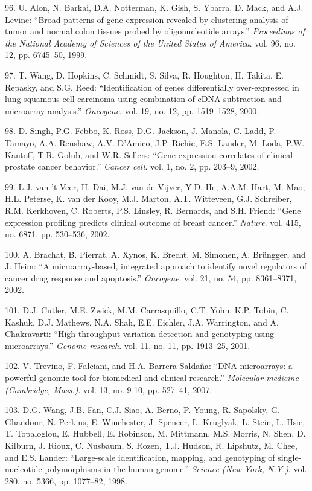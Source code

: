 \documentclass[12pt,a4paper,twoside]{ugathesis}
\theoremstyle{definition}
\theoremstyle{definition}
\theoremstyle{definition}
\theoremstyle{remark}
\begin{document}
\hypertarget{ref-Alon1999}{}
96. U. Alon, N. Barkai, D.A. Notterman, K. Gish, S. Ybarra, D. Mack, and
A.J. Levine: ``Broad patterns of gene expression revealed by clustering
analysis of tumor and normal colon tissues probed by oligonucleotide
arrays.'' \emph{Proceedings of the National Academy of Sciences of the
United States of America}. vol. 96, no. 12, pp. 6745--50, 1999.

\hypertarget{ref-Wang2000}{}
97. T. Wang, D. Hopkins, C. Schmidt, S. Silva, R. Houghton, H. Takita,
E. Repasky, and S.G. Reed: ``Identification of genes differentially
over-expressed in lung squamous cell carcinoma using combination of cDNA
subtraction and microarray analysis.'' \emph{Oncogene}. vol. 19, no. 12,
pp. 1519--1528, 2000.

\hypertarget{ref-Singh2002}{}
98. D. Singh, P.G. Febbo, K. Ross, D.G. Jackson, J. Manola, C. Ladd, P.
Tamayo, A.A. Renshaw, A.V. D'Amico, J.P. Richie, E.S. Lander, M. Loda,
P.W. Kantoff, T.R. Golub, and W.R. Sellers: ``Gene expression correlates
of clinical prostate cancer behavior.'' \emph{Cancer cell}. vol. 1, no.
2, pp. 203--9, 2002.

\hypertarget{ref-VantVeer2002}{}
99. L.J. van 't Veer, H. Dai, M.J. van de Vijver, Y.D. He, A.A.M. Hart,
M. Mao, H.L. Peterse, K. van der Kooy, M.J. Marton, A.T. Witteveen, G.J.
Schreiber, R.M. Kerkhoven, C. Roberts, P.S. Linsley, R. Bernards, and
S.H. Friend: ``Gene expression profiling predicts clinical outcome of
breast cancer.'' \emph{Nature}. vol. 415, no. 6871, pp. 530--536, 2002.

\hypertarget{ref-Brachat2002}{}
100. A. Brachat, B. Pierrat, A. Xynos, K. Brecht, M. Simonen, A.
Brüngger, and J. Heim: ``A microarray-based, integrated approach to
identify novel regulators of cancer drug response and apoptosis.''
\emph{Oncogene}. vol. 21, no. 54, pp. 8361--8371, 2002.

\hypertarget{ref-Cutler2001}{}
101. D.J. Cutler, M.E. Zwick, M.M. Carrasquillo, C.T. Yohn, K.P. Tobin,
C. Kashuk, D.J. Mathews, N.A. Shah, E.E. Eichler, J.A. Warrington, and
A. Chakravarti: ``High-throughput variation detection and genotyping
using microarrays.'' \emph{Genome research}. vol. 11, no. 11, pp.
1913--25, 2001.

\hypertarget{ref-Trevino2007}{}
102. V. Trevino, F. Falciani, and H.A. Barrera-Saldaña: ``DNA
microarrays: a powerful genomic tool for biomedical and clinical
research.'' \emph{Molecular medicine (Cambridge, Mass.)}. vol. 13, no.
9-10, pp. 527--41, 2007.

\hypertarget{ref-Wang1998}{}
103. D.G. Wang, J.B. Fan, C.J. Siao, A. Berno, P. Young, R. Sapolsky, G.
Ghandour, N. Perkins, E. Winchester, J. Spencer, L. Kruglyak, L. Stein,
L. Hsie, T. Topaloglou, E. Hubbell, E. Robinson, M. Mittmann, M.S.
Morris, N. Shen, D. Kilburn, J. Rioux, C. Nusbaum, S. Rozen, T.J.
Hudson, R. Lipshutz, M. Chee, and E.S. Lander: ``Large-scale
identification, mapping, and genotyping of single-nucleotide
polymorphisms in the human genome.'' \emph{Science (New York, N.Y.)}.
vol. 280, no. 5366, pp. 1077--82, 1998.
\end{document}
